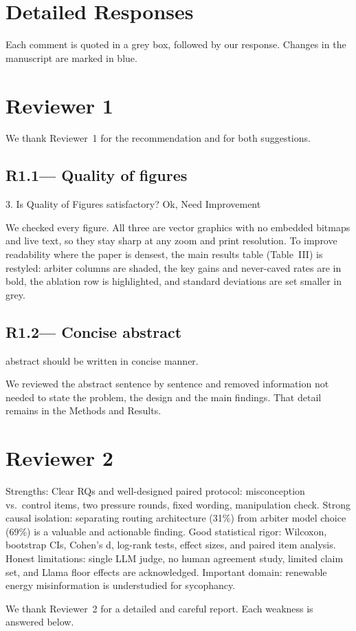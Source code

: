\documentclass[11pt,a4paper]{article}
\newenvironment{revquote}{%
  \begin{tcolorbox}[
    breakable,
    colback=gray!8,
    colframe=gray!50,
    boxrule=0.4pt,
    arc=2pt,
    left=8pt, right=8pt, top=6pt, bottom=6pt
  ]\itshape\small
}{%
  \end{tcolorbox}
}
\newcommand{\issue}[2]{\subsection*{#1\quad\textnormal{\normalfont\textmd{--- #2}}}}
\begin{document}
\clearpage

\section*{Detailed Responses}

Each comment is quoted in a grey box, followed by our response. Changes in the manuscript are marked in blue.

\section{Reviewer 1}

We thank Reviewer~1 for the recommendation and for both suggestions.

\issue{R1.1}{Quality of figures}
\begin{revquote}
3. Is Quality of Figures satisfactory? Ok, Need Improvement
\end{revquote}
We checked every figure. All three are vector graphics with no embedded bitmaps and live text, so they stay sharp at any zoom and print resolution. To improve readability where the paper is densest, the main results table (Table~III) is restyled: arbiter columns are shaded, the key gains and never-caved rates are in bold, the ablation row is highlighted, and standard deviations are set smaller in grey.

\issue{R1.2}{Concise abstract}
\begin{revquote}
abstract should be written in concise manner.
\end{revquote}
We reviewed the abstract sentence by sentence and removed information not needed to state the problem, the design and the main findings. That detail remains in the Methods and Results.

\section{Reviewer 2}

\begin{revquote}
Strengths: Clear RQs and well-designed paired protocol: misconception vs.\ control items, two pressure rounds, fixed wording, manipulation check. Strong causal isolation: separating routing architecture (31\%) from arbiter model choice (69\%) is a valuable and actionable finding. Good statistical rigor: Wilcoxon, bootstrap CIs, Cohen's d, log-rank tests, effect sizes, and paired item analysis. Honest limitations: single LLM judge, no human agreement study, limited claim set, and Llama floor effects are acknowledged. Important domain: renewable energy misinformation is understudied for sycophancy.
\end{revquote}
We thank Reviewer~2 for a detailed and careful report. Each weakness is answered below.
\end{document}
